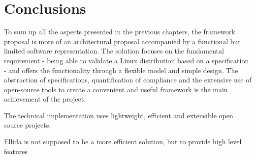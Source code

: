 \chapter{Conclusions}

To sum up all the aspects presented in the previous chapters, the framework proposal is more of an architectural proposal accompanied by a functional but limited software representation. The solution focuses on the fundamental requirement - being able to validate a Linux distribution based on a specification - and offers the functionality through a flexible model and simple design. The abstraction of specifications, quantification of compliance and the extensive use of open-source tools to create a convenient and useful framework is the main achievement of the project.

The technical implementation uses lightweight, efficient and extensible open source projects. 

Ellida is not supposed to be a more efficient solution, but to provide high level features
